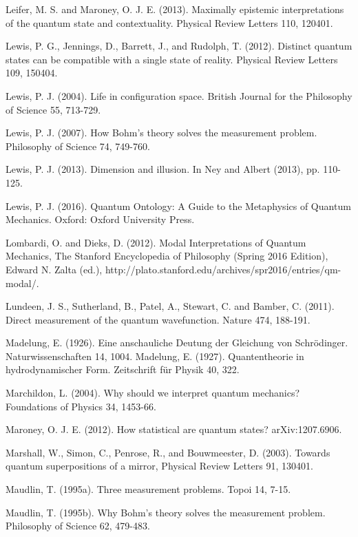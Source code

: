 \begin{thebibliography}{}
\bibitem{} Leifer, M. S. and Maroney,  O. J. E. (2013). Maximally epistemic interpretations of the quantum state and contextuality. Physical Review Letters 110, 120401.


\bibitem{} Lewis, P. G., Jennings, D., Barrett, J., and Rudolph, T.  (2012). Distinct quantum states can be compatible with a single state of reality. Physical Review Letters 109, 150404.

\bibitem{} Lewis, P. J. (2004). Life in configuration space. British Journal for the Philosophy of Science 55, 713-729.

\bibitem{} Lewis, P. J.  (2007). How Bohm's theory solves the measurement problem. Philosophy of Science 74, 749-760.

\bibitem{} Lewis, P. J.  (2013). Dimension and illusion. In Ney and Albert (2013), pp. 110-125.

\bibitem{} Lewis, P. J.  (2016). Quantum Ontology: A Guide to the Metaphysics of Quantum Mechanics. Oxford: Oxford University Press.

\bibitem{} Lombardi, O. and Dieks, D. (2012). Modal Interpretations of Quantum Mechanics, The Stanford Encyclopedia of Philosophy (Spring 2016 Edition), Edward N. Zalta (ed.), http://plato.stanford.edu/archives/spr2016/entries/qm-modal/.

\bibitem{} Lundeen, J. S., Sutherland, B., Patel, A., Stewart, C. and Bamber, C. (2011). Direct measurement of the quantum wavefunction. Nature 474, 188-191.

\bibitem{} Madelung, E. (1926). Eine anschauliche Deutung der Gleichung von Schrödinger. Naturwissenschaften 14, 1004.
\bibitem{} Madelung, E. (1927). Quantentheorie in hydrodynamischer Form.  Zeitschrift f\"{u}r Physik 40, 322.


\bibitem{}  Marchildon, L. (2004). Why should we interpret quantum mechanics? Foundations of Physics 34, 1453-66.

\bibitem{}  Maroney, O. J. E. (2012). How statistical are quantum states? arXiv:1207.6906.

\bibitem{} Marshall, W., Simon, C., Penrose, R., and Bouwmeester, D. (2003). Towards quantum superpositions of a mirror, Physical Review Letters 91, 130401.

\bibitem{} Maudlin, T. (1995a). Three measurement problems. Topoi 14, 7-15.

\bibitem{} Maudlin, T. (1995b). Why Bohm's theory solves the measurement problem. Philosophy of Science 62, 479-483.


\end{thebibliography}
